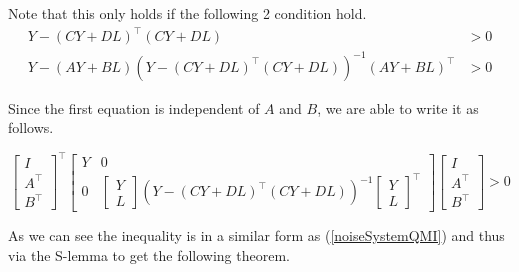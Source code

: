 Note that this only holds if the following 2 condition hold.
\begin{align*}
	Y - (CY + DL)^\top(CY + DL) &> 0 \\
	Y - (AY + BL) \left(Y - (CY + DL)^\top(CY + DL)\right)^{-1} (AY + BL)^\top &> 0
\end{align*}

Since the first equation is independent of $A$ and $B$, we are able to write it as follows.

\begin{equation*}
	\left[\begin{array}{c}
		I \\ \hline A^\top \\ B^\top
	\end{array}\right]^\top
	\left[\begin{array}{c|c}
		Y & 0 \\ \hline
		0 & \begin{bmatrix} Y \\ L \end{bmatrix} \left(Y - (CY + DL)^\top(CY + DL)\right)^{-1} \begin{bmatrix} Y \\ L \end{bmatrix}^\top
	\end{array}\right]
	\left[\begin{array}{c}
		I \\ \hline A^\top \\ B^\top
	\end{array}\right] > 0
\end{equation*}

As we can see the inequality is in a similar form as (\ref{noiseSystemQMI}) and thus via the S-lemma to get the following theorem.

